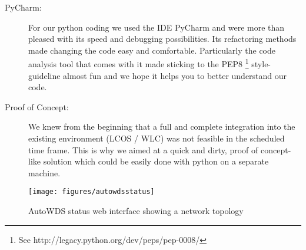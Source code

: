 \begin{description}
    \item [PyCharm:]
      For our python coding we used the \ac{IDE} PyCharm \cite{pycharm} and were more than pleased with its speed and debugging possibilities.
      Its refactoring methods made changing the code easy and comfortable. Particularly the code analysis tool that comes with it made sticking to the
      \ac{PEP8} \footnote{See http://legacy.python.org/dev/peps/pep-0008/} style-guideline almost fun and we hope it helps you to better understand our code.
      
\newpage
      
    \item [Proof of Concept:]
      We knew from the beginning that a full and complete integration into the existing environment (\ac{LCOS} / \ac{WLC}) was not feasible in the scheduled time frame.
      This is why we aimed at a quick and dirty, proof of concept-like solution which could be easily done with python on a separate machine.
      
    \end{description}

    \begin{figure}[h]
      \centering
      \texttt{[image: figures/autowdsstatus]}
      \caption{AutoWDS status web interface showing a network topology}
      \label{fig:autowdsstatus}
    \end{figure}
    
\clearpage

  
